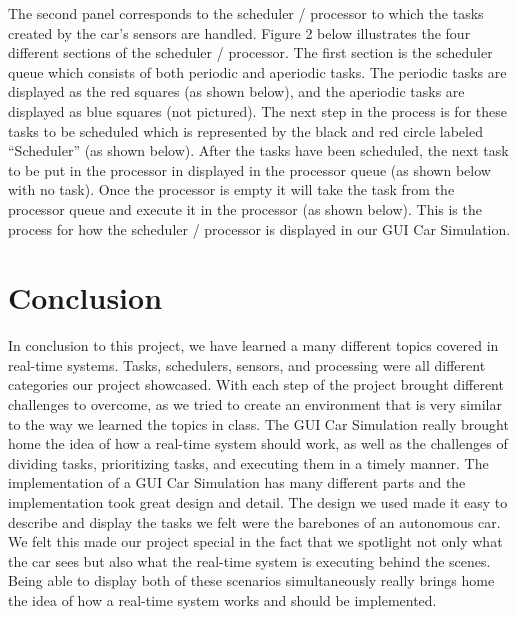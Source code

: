 \documentclass{article} %
\begin{document}
The second panel corresponds to the scheduler / processor to which the tasks 
created by the car’s sensors are handled.  Figure 2 below illustrates the four 
different sections of the scheduler / processor.  The first section is the scheduler 
queue which consists of both periodic and aperiodic tasks.  The periodic tasks are 
displayed as the red squares (as shown below), and the aperiodic tasks are 
displayed as blue squares (not pictured).  The next step in the process is for these 
tasks to be scheduled which is represented by the black and red circle labeled 
“Scheduler” (as shown below).  After the tasks have been scheduled, the next task to 
be put in the processor in displayed in the processor queue (as shown below with 
no task).  Once the processor is empty it will take the task from the processor queue 
and execute it in the processor (as shown below).  This is the process for how the 
scheduler / processor is displayed in our GUI Car Simulation.

\section{Conclusion}
In conclusion to this project, we have learned a many different topics covered in 
real-time systems.   Tasks, schedulers, sensors, and processing were all different 
categories our project showcased.  With each step of the project brought different 
challenges to overcome, as we tried to create an environment that is very similar to 
the way we learned the topics in class.  The GUI Car Simulation really brought home 
the idea of how a real-time system should work, as well as the challenges of dividing 
tasks, prioritizing tasks, and executing them in a timely manner.
The implementation of a GUI Car Simulation has many different parts and the 
implementation took great design and detail.  The design we used made it easy to 
describe and display the tasks we felt were the barebones of an autonomous car.   
We felt this made our project special in the fact that we spotlight not only what the 
car sees but also what the real-time system is executing behind the scenes.  Being 
able to display both of these scenarios simultaneously really brings home the idea of 
how a real-time system works and should be implemented.
\end{document}
